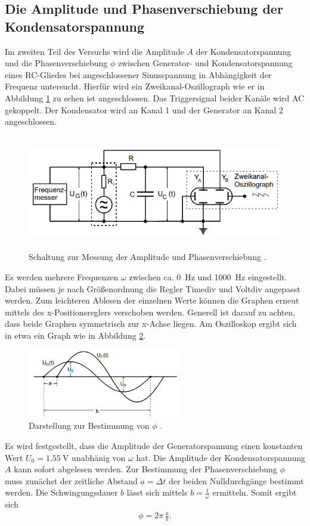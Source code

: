 \subsection{Die Amplitude und Phasenverschiebung der Kondensatorspannung}
\label{sec:durchf_b}
Im zweiten Teil des Versuchs wird die Amplitude $A$ der Kondensatorspannung und die Phasenverschiebung $\phi$ zwischen Generator-
und Kondensatorspannung eines RC-Gliedes bei angeschlossener Sinusspannung in Abhängigkeit der Frequenz untersucht.
Hierfür wird ein Zweikanal-Oszillograph wie er in Abbildung \ref{fig:ampl_phasenverschiebung} zu sehen ist angeschlossen.
Das Triggersignal beider Kanäle wird AC gekoppelt.
Der Kondensator wird an Kanal 1 und der Generator an Kanal 2 angeschlossen.
\begin{figure}[H]
    \centering
    \includegraphics[height=5cm]{abbildungen/ampl_phasenverschiebung.png}
    \caption{Schaltung zur Messung der Amplitude und Phasenverschiebung \cite{man:v353}.}
    \label{fig:ampl_phasenverschiebung}
\end{figure}
\noindent
Es werden mehrere Frequenzen $\omega$ zwischen ca. \qty{0}{\hertz} und \qty{1000}{\hertz} eingestellt.
Dabei müssen je nach Größenordnung die Regler Timediv und Voltdiv angepasst werden.
Zum leichteren Ablesen der einzelnen Werte können die Graphen erneut mittels des x-Positionsreglers verschoben werden.
Generell ist darauf zu achten, dass beide Graphen symmetrisch zur x-Achse liegen.
Am Oszilloskop ergibt sich in etwa ein Graph wie in Abbildung \ref{fig:graph_phasenverschiebung}.
\begin{figure}[H]
    \centering
    \includegraphics[height=3cm]{abbildungen/graph_phasenverschiebung.png}
    \caption{Darstellung zur Bestimmung von $\phi$ \cite{man:v353}.}
    \label{fig:graph_phasenverschiebung}
\end{figure}
\noindent
Es wird festgestellt, dass die Amplitude der Generatorspannung einen konstanten Wert $U_0 = \qty[]{1.55}{\volt}$ unabhänig von $\omega$ hat.
Die Amplitude der Kondensatorspannung $A$ kann sofort abgelesen werden.
Zur Bestimmung der Phasenverschiebung $\phi$ muss zunächst der zeitliche Abstand $a = \Delta t$ der beiden Nulldurchgänge bestimmt werden.
Die Schwingungsdauer $b$ lässt sich mittels $b = \frac{1}{\omega}$ ermitteln.
Somit ergibt sich 
\begin{align}
    \phi = 2 \pi \, \frac{a}{b}.
    \label{eq:phase}
\end{align}
%